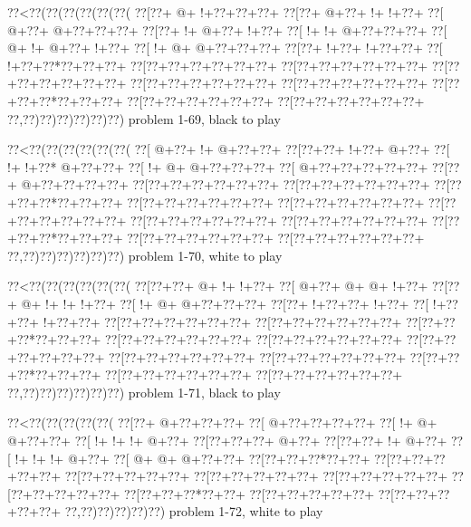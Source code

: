 \vbox{\vbox{\goo
\0??<\0??(\0??(\0??(\0??(\0??(\0??(
\0??[\0??+\- @+\- !+\0??+\0??+\0??+
\0??[\0??+\- @+\0??+\- !+\- !+\0??+
\0??[\- @+\0??+\- @+\0??+\0??+\0??+
\0??[\0??+\- !+\- @+\0??+\- !+\0??+
\0??[\- !+\- !+\- @+\0??+\0??+\0??+
\0??[\- @+\- !+\- @+\0??+\- !+\0??+
\0??[\- !+\- @+\- @+\0??+\0??+\0??+
\0??[\0??+\- !+\0??+\- !+\0??+\0??+
\0??[\- !+\0??+\0??*\0??+\0??+\0??+
\0??[\0??+\0??+\0??+\0??+\0??+\0??+
\0??[\0??+\0??+\0??+\0??+\0??+\0??+
\0??[\0??+\0??+\0??+\0??+\0??+\0??+
\0??[\0??+\0??+\0??+\0??+\0??+\0??+
\0??[\0??+\0??+\0??+\0??+\0??+\0??+
\0??[\0??+\0??+\0??*\0??+\0??+\0??+
\0??[\0??+\0??+\0??+\0??+\0??+\0??+
\0??[\0??+\0??+\0??+\0??+\0??+\0??+
\0??,\0??)\0??)\0??)\0??)\0??)\0??)
}
\hfil problem 1-69, black to play\hfil\break
}

\vbox{\vbox{\goo
\0??<\0??(\0??(\0??(\0??(\0??(\0??(
\0??[\- @+\0??+\- !+\- @+\0??+\0??+
\0??[\0??+\0??+\- !+\0??+\- @+\0??+
\0??[\- !+\- !+\0??*\- @+\0??+\0??+
\0??[\- !+\- @+\- @+\0??+\0??+\0??+
\0??[\- @+\0??+\0??+\0??+\0??+\0??+
\0??[\0??+\- @+\0??+\0??+\0??+\0??+
\0??[\0??+\0??+\0??+\0??+\0??+\0??+
\0??[\0??+\0??+\0??+\0??+\0??+\0??+
\0??[\0??+\0??+\0??*\0??+\0??+\0??+
\0??[\0??+\0??+\0??+\0??+\0??+\0??+
\0??[\0??+\0??+\0??+\0??+\0??+\0??+
\0??[\0??+\0??+\0??+\0??+\0??+\0??+
\0??[\0??+\0??+\0??+\0??+\0??+\0??+
\0??[\0??+\0??+\0??+\0??+\0??+\0??+
\0??[\0??+\0??+\0??*\0??+\0??+\0??+
\0??[\0??+\0??+\0??+\0??+\0??+\0??+
\0??[\0??+\0??+\0??+\0??+\0??+\0??+
\0??,\0??)\0??)\0??)\0??)\0??)\0??)
}
\hfil problem 1-70, white to play\hfil\break
}

\vbox{\vbox{\goo
\0??<\0??(\0??(\0??(\0??(\0??(\0??(
\0??[\0??+\0??+\- @+\- !+\- !+\0??+
\0??[\- @+\0??+\- @+\- @+\- !+\0??+
\0??[\0??+\- @+\- !+\- !+\- !+\0??+
\0??[\- !+\- @+\- @+\0??+\0??+\0??+
\0??[\0??+\- !+\0??+\0??+\- !+\0??+
\0??[\- !+\0??+\0??+\- !+\0??+\0??+
\0??[\0??+\0??+\0??+\0??+\0??+\0??+
\0??[\0??+\0??+\0??+\0??+\0??+\0??+
\0??[\0??+\0??+\0??*\0??+\0??+\0??+
\0??[\0??+\0??+\0??+\0??+\0??+\0??+
\0??[\0??+\0??+\0??+\0??+\0??+\0??+
\0??[\0??+\0??+\0??+\0??+\0??+\0??+
\0??[\0??+\0??+\0??+\0??+\0??+\0??+
\0??[\0??+\0??+\0??+\0??+\0??+\0??+
\0??[\0??+\0??+\0??*\0??+\0??+\0??+
\0??[\0??+\0??+\0??+\0??+\0??+\0??+
\0??[\0??+\0??+\0??+\0??+\0??+\0??+
\0??,\0??)\0??)\0??)\0??)\0??)\0??)
}
\hfil problem 1-71, black to play\hfil\break
}

\vbox{\vbox{\goo
\0??<\0??(\0??(\0??(\0??(\0??(
\0??[\0??+\- @+\0??+\0??+\0??+
\0??[\- @+\0??+\0??+\0??+\0??+
\0??[\- !+\- @+\- @+\0??+\0??+
\0??[\- !+\- !+\- !+\- @+\0??+
\0??[\0??+\0??+\0??+\- @+\0??+
\0??[\0??+\0??+\- !+\- @+\0??+
\0??[\- !+\- !+\- !+\- @+\0??+
\0??[\- @+\- @+\- @+\0??+\0??+
\0??[\0??+\0??+\0??*\0??+\0??+
\0??[\0??+\0??+\0??+\0??+\0??+
\0??[\0??+\0??+\0??+\0??+\0??+
\0??[\0??+\0??+\0??+\0??+\0??+
\0??[\0??+\0??+\0??+\0??+\0??+
\0??[\0??+\0??+\0??+\0??+\0??+
\0??[\0??+\0??+\0??*\0??+\0??+
\0??[\0??+\0??+\0??+\0??+\0??+
\0??[\0??+\0??+\0??+\0??+\0??+
\0??,\0??)\0??)\0??)\0??)\0??)
}
\hfil problem 1-72, white to play\hfil\break
}

